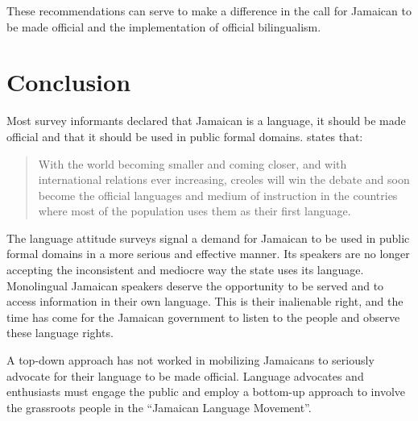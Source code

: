 \documentclass[output=paper,colorlinks,citecolor=brown]{langscibook}
\begin{document}
These recommendations can serve to make a difference in the call for Jamaican to be made official and the implementation of official bilingualism.

\section{Conclusion}

Most survey informants declared that Jamaican is a language, it should be made official and that it should be used in public formal domains. \citet[24]{ShahSanghavi2017} states that:

\begin{quote}
With the world becoming smaller and coming closer, and with international relations ever increasing, creoles will win the debate and soon become the official languages and medium of instruction in the countries where most of the population uses them as their first language.
\end{quote}

The language attitude surveys signal a demand for Jamaican to be used in public formal domains in a more serious and effective manner. Its speakers are no longer accepting the inconsistent and mediocre way the state uses its language. Monolingual Jamaican speakers deserve the opportunity to be served and to access information in their own language. This is their inalienable right, and the time has come for the Jamaican government to listen to the people and observe these language rights. 

A top-down approach has not worked in mobilizing Jamaicans to seriously advocate for their language to be made official. Language advocates and enthusiasts must engage the public and employ a bottom-up approach to involve the grassroots people in the “Jamaican Language Movement”.

{\sloppy\printbibliography[heading=subbibliography,notkeyword=this]}
\end{document}
